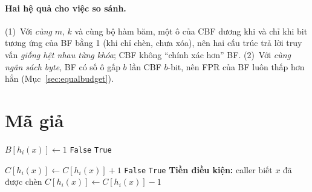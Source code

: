 \documentclass[11pt,a4paper]{article}
\begin{document}
\paragraph{Hai hệ quả cho việc so sánh.}
(1)~Với \emph{cùng} $m$, $k$ và cùng bộ hàm băm, một ô của CBF dương khi và
chỉ khi bit tương ứng của BF bằng 1 (khi chỉ chèn, chưa xóa), nên hai cấu
trúc trả lời truy vấn \emph{giống hệt nhau từng khóa}; CBF không ``chính
xác hơn'' BF. (2)~Với \emph{cùng ngân sách byte}, BF có số ô gấp $b$ lần CBF
$b$-bit, nên FPR của BF luôn thấp hơn hẳn (Mục~\ref{sec:equalbudget}).

\section{Mã giả}
\begin{algorithm}[H]
\caption{Bloom Filter: Insert và Query}
\begin{algorithmic}[1]
   \State $B[h_i(x)] \gets 1$ \EndFor
\EndProcedure
{}
      \State \Return \texttt{False} 
     \EndIf
  \EndFor
  \State \Return \texttt{True} 
\EndProcedure
\end{algorithmic}
\end{algorithm}

\begin{algorithm}[H]
\caption{Counting Bloom Filter: Insert, Query, Delete (insert bão hòa)}
\begin{algorithmic}[1]
      \State $C[h_i(x)] \gets C[h_i(x)]+1$
     \EndIf {}
  \EndFor
\EndProcedure
{}
      \State \Return \texttt{False} \EndIf
  \EndFor
  \State \Return \texttt{True}
\EndProcedure
{}
  \State \textbf{Tiền điều kiện:} caller biết $x$ đã được chèn
      \State $C[h_i(x)] \gets C[h_i(x)]-1$
     \EndIf
  \EndFor
\EndProcedure
\end{algorithmic}
\end{algorithm}
\end{document}
